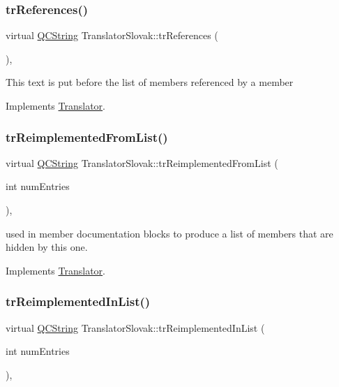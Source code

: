 \subsubsection{\texorpdfstring{trReferences()}{trReferences()}}
{\footnotesize\ttfamily virtual \mbox{\hyperlink{class_q_c_string}{Q\+C\+String}} Translator\+Slovak\+::tr\+References (\begin{DoxyParamCaption}{ }\end{DoxyParamCaption})\hspace{0.3cm}{\ttfamily [inline]}, {\ttfamily [virtual]}}

This text is put before the list of members referenced by a member 

Implements \mbox{\hyperlink{class_translator}{Translator}}.

\mbox{\label{class_translator_slovak_ac85fecd269fb616a4ed2db374f98786d}} 
\subsubsection{\texorpdfstring{trReimplementedFromList()}{trReimplementedFromList()}}
{\footnotesize\ttfamily virtual \mbox{\hyperlink{class_q_c_string}{Q\+C\+String}} Translator\+Slovak\+::tr\+Reimplemented\+From\+List (\begin{DoxyParamCaption}\item[{int}]{num\+Entries }\end{DoxyParamCaption})\hspace{0.3cm}{\ttfamily [inline]}, {\ttfamily [virtual]}}

used in member documentation blocks to produce a list of members that are hidden by this one. 

Implements \mbox{\hyperlink{class_translator}{Translator}}.

\mbox{\label{class_translator_slovak_a43be09d7afa079e251ef4d7daa3d04ca}} 
\subsubsection{\texorpdfstring{trReimplementedInList()}{trReimplementedInList()}}
{\footnotesize\ttfamily virtual \mbox{\hyperlink{class_q_c_string}{Q\+C\+String}} Translator\+Slovak\+::tr\+Reimplemented\+In\+List (\begin{DoxyParamCaption}\item[{int}]{num\+Entries }\end{DoxyParamCaption})\hspace{0.3cm}{\ttfamily [inline]}, {\ttfamily [virtual]}}

